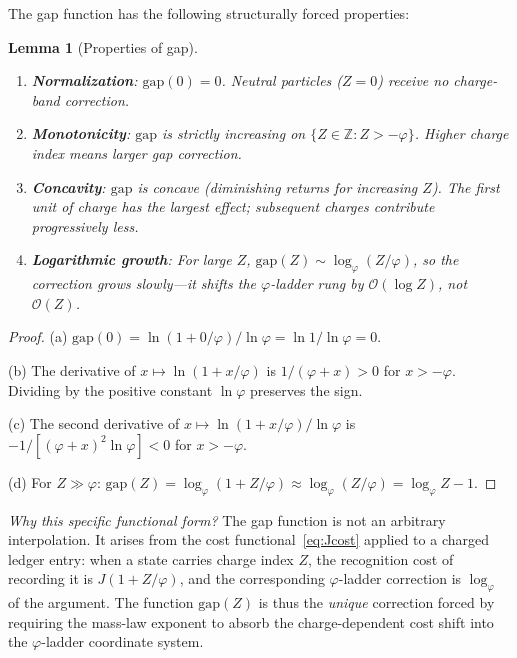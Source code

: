 \documentclass[11pt,a4paper]{article}
\newtheorem{lemma}[theorem]{Lemma}
\theoremstyle{definition}
\theoremstyle{remark}
\newcommand{\phig}{\varphi}
\newcommand{\Jcost}{J}
\newcommand{\Zidx}{Z}
\begin{document}
\noindent
The gap function has the following structurally forced properties:

\begin{lemma}[Properties of gap]
\label{lem:gap_properties}
\leavevmode
\begin{enumerate}[nosep,label=(\alph*)]
  \item \textbf{Normalization}: $\mathrm{gap}(0) = 0$.\;  Neutral particles
        ($\Zidx = 0$) receive no charge-band correction.
  \item \textbf{Monotonicity}: $\mathrm{gap}$ is strictly increasing on
        $\{Z \in \mathbb{Z} : Z > -\phig\}$.  Higher charge index means
        larger gap correction.
  \item \textbf{Concavity}: $\mathrm{gap}$ is concave (diminishing returns for
        increasing $\Zidx$).  The first unit of charge has the largest effect;
        subsequent charges contribute progressively less.
  \item \textbf{Logarithmic growth}: For large $\Zidx$,
        $\mathrm{gap}(\Zidx) \sim \log_{\phig}(\Zidx/\phig)$, so the
        correction grows slowly---it shifts the $\phig$-ladder rung by
        $\mathcal{O}(\log \Zidx)$, not $\mathcal{O}(\Zidx)$.
\end{enumerate}
\end{lemma}

\begin{proof}
(a) $\mathrm{gap}(0) = \ln(1 + 0/\phig)/\ln\phig = \ln 1/\ln\phig = 0$.

(b) The derivative of $x \mapsto \ln(1 + x/\phig)$ is $1/(\phig + x) > 0$
for $x > -\phig$.  Dividing by the positive constant $\ln\phig$ preserves
the sign.

(c) The second derivative of $x \mapsto \ln(1 + x/\phig)/\ln\phig$ is
$-1/[(\phig + x)^2 \ln\phig] < 0$ for $x > -\phig$.

(d) For $\Zidx \gg \phig$:
$\mathrm{gap}(\Zidx) = \log_\phig(1 + \Zidx/\phig) \approx
\log_\phig(\Zidx/\phig) = \log_\phig \Zidx - 1$.
\end{proof}

\noindent\textit{Why this specific functional form?}\quad
The gap function is not an arbitrary interpolation.  It arises from the
cost functional~\eqref{eq:Jcost} applied to a charged ledger entry: when a
state carries charge index $\Zidx$, the recognition cost of recording it is
$\Jcost(1 + \Zidx/\phig)$, and the corresponding $\phig$-ladder correction is
$\log_\phig$ of the argument.  The function $\mathrm{gap}(\Zidx)$ is thus the
\emph{unique} correction forced by requiring the mass-law exponent to absorb
the charge-dependent cost shift into the $\phig$-ladder coordinate system.
\end{document}
